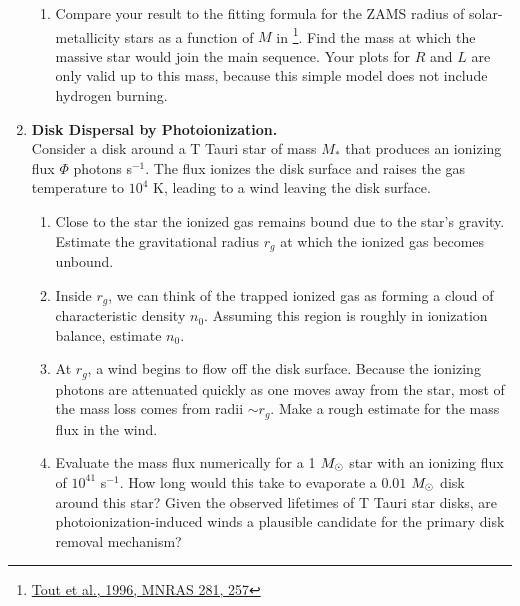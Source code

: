\begin{enumerate}
\begin{enumerate}
\item Compare your result to the fitting formula for the ZAMS radius of solar-metallicity stars as a function of $M$ in \citet{tout96a}\footnote{\href{http://adsabs.harvard.edu/abs/1996MNRAS.281..257T}{Tout et al., 1996, MNRAS 281, 257}}. Find the mass at which the massive star would join the main sequence. Your plots for $R$ and $L$ are only valid up to this mass, because this simple model does not include hydrogen burning.
\end{enumerate}

\item {\bf Disk Dispersal by Photoionization.}\\
Consider a disk around a T Tauri star of mass $M_*$ that produces an ionizing flux $\Phi$ photons s$^{-1}$. The flux ionizes the disk surface and raises the gas temperature to $10^4$ K, leading to a wind leaving the disk surface.
\begin{enumerate}
\item Close to the star the ionized gas remains bound due to the star's gravity. Estimate the gravitational radius $r_g$ at which the ionized gas becomes unbound.
\item Inside $r_g$, we can think of the trapped ionized gas as forming a cloud of characteristic density $n_0$. Assuming this region is roughly in ionization balance, estimate $n_0$.
\item At $r_g$, a wind begins to flow off the disk surface. Because the ionizing photons are attenuated quickly as one moves away from the star, most of the mass loss comes from radii $\sim r_g$. Make a rough estimate for the mass flux in the wind.
\item Evaluate the mass flux numerically for a 1 $M_{\odot}$ star with an ionizing flux of $10^{41}$ s$^{-1}$. How long would this take to evaporate a $0.01$ $M_{\odot}$ disk around this star? Given the observed lifetimes of T Tauri star disks, are photoionization-induced winds a plausible candidate for the primary disk removal mechanism?
\end{enumerate}


\end{enumerate}
